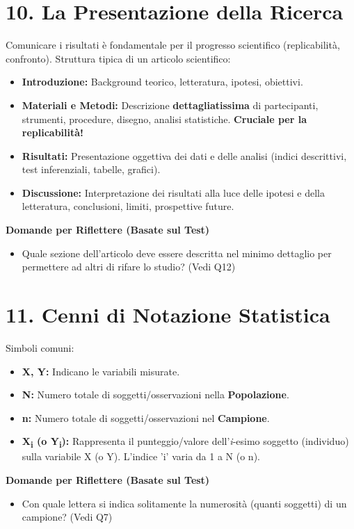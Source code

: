 \documentclass[12pt, a4paper]{article}
\newenvironment{reflectionbox}{%
    \begin{framed}\par\medskip\noindent
    \textbf{\color{boxtitlecolor}Domande per Riflettere (Basate sul Test)} \par
    \begin{itemize}[leftmargin=*, label=$\blacktriangleright$]
}{%
    \end{itemize}\par\medskip
    \end{framed}
}
\begin{document}
\section*{10. La Presentazione della Ricerca}
Comunicare i risultati è fondamentale per il progresso scientifico (replicabilità, confronto). Struttura tipica di un articolo scientifico:
\begin{itemize}
    \item \textbf{Introduzione:} Background teorico, letteratura, ipotesi, obiettivi.
    \item \textbf{Materiali e Metodi:} Descrizione \textbf{dettagliatissima} di partecipanti, strumenti, procedure, disegno, analisi statistiche. \textbf{Cruciale per la replicabilità!}
    \item \textbf{Risultati:} Presentazione oggettiva dei dati e delle analisi (indici descrittivi, test inferenziali, tabelle, grafici).
    \item \textbf{Discussione:} Interpretazione dei risultati alla luce delle ipotesi e della letteratura, conclusioni, limiti, prospettive future.
\end{itemize}

\begin{reflectionbox}
    \item Quale sezione dell'articolo deve essere descritta nel minimo dettaglio per permettere ad altri di rifare lo studio? (Vedi Q12)
\end{reflectionbox}

\section*{11. Cenni di Notazione Statistica}
Simboli comuni:
\begin{itemize}
    \item \textbf{X, Y:} Indicano le variabili misurate.
    \item \textbf{N:} Numero totale di soggetti/osservazioni nella \textbf{Popolazione}.
    \item \textbf{n:} Numero totale di soggetti/osservazioni nel \textbf{Campione}.
    \item \textbf{X\textsubscript{i} (o Y\textsubscript{i}):} Rappresenta il punteggio/valore dell'\textit{i}-esimo soggetto (individuo) sulla variabile X (o Y). L'indice 'i' varia da 1 a N (o n).
\end{itemize}

\begin{reflectionbox}
    \item Con quale lettera si indica solitamente la numerosità (quanti soggetti) di un campione? (Vedi Q7)
\end{reflectionbox}
\end{document}
